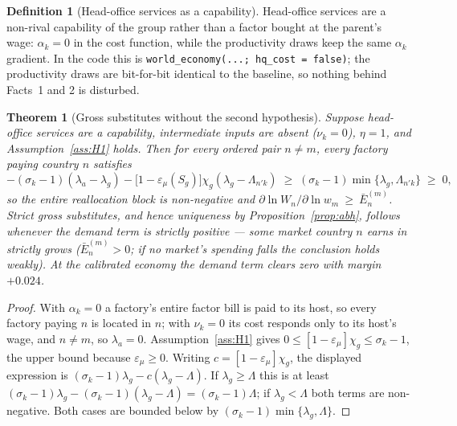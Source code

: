 \documentclass[11pt]{article}
\theoremstyle{plain}
\newtheorem{theorem}{Theorem}
\theoremstyle{remark}
\theoremstyle{definition}
\newtheorem{definition}{Definition}
\begin{document}
\begin{definition}[Head-office services as a capability]
Head-office services are a non-rival capability of the group rather than a factor
bought at the parent's wage: $\alpha_k=0$ in the cost function, while the productivity
draws keep the same $\alpha_k$ gradient. In the code this is
\texttt{world\_economy(...; hq\_cost = false)}; the productivity draws are bit-for-bit
identical to the baseline, so nothing behind Facts~1 and 2 is disturbed.
\end{definition}

\begin{theorem}[Gross substitutes without the second hypothesis]\label{thm:simple}
Suppose head-office services are a capability, intermediate inputs are absent
($\nu_k=0$), $\eta=1$, and Assumption~\ref{ass:H1} holds. Then for every ordered pair
$n\neq m$, every factory paying country $n$ satisfies
\[
  -(\sigma_k-1)(\lambda_a-\lambda_g)-\big[1-\varepsilon_\mu(S_g)\big]\chi_g(\lambda_g
  -\Lambda_{n'k})\;\ge\;(\sigma_k-1)\min\{\lambda_g,\Lambda_{n'k}\}\;\ge\;0 ,
\]
so the entire reallocation block is non-negative and
$\partial\ln W_n/\partial\ln w_m\ \ge\ \bar E^{(m)}_n$. \emph{Strict} gross
substitutes, and hence uniqueness by Proposition~\ref{prop:abh}, follows whenever the
demand term is strictly positive --- some market country $n$ earns in strictly grows
($\bar E^{(m)}_n>0$; if no market's spending falls the conclusion holds weakly). At
the calibrated economy the demand term clears zero with margin $+0.024$.
\end{theorem}

\begin{proof}
With $\alpha_k=0$ a factory's entire factor bill is paid to its host, so every factory
paying $n$ is located in $n$; with $\nu_k=0$ its cost responds only to its host's wage,
and $n\neq m$, so $\lambda_a=0$. Assumption~\ref{ass:H1} gives
$0\le[1-\varepsilon_\mu]\chi_g\le\sigma_k-1$, the upper bound because
$\varepsilon_\mu\ge0$. Writing $c=[1-\varepsilon_\mu]\chi_g$, the displayed expression is
$(\sigma_k-1)\lambda_g-c(\lambda_g-\Lambda)$. If $\lambda_g\ge\Lambda$ this is at least
$(\sigma_k-1)\lambda_g-(\sigma_k-1)(\lambda_g-\Lambda)=(\sigma_k-1)\Lambda$; if
$\lambda_g<\Lambda$ both terms are non-negative. Both cases are bounded below by
$(\sigma_k-1)\min\{\lambda_g,\Lambda\}$.
\end{proof}
\end{document}
